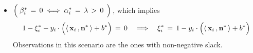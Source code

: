 \begin{itemize}
\item
	$\left(\; \beta_{i}^{*} \,=\, \overset{{\color{white}.}}{0}
	\; \Longleftrightarrow\;
	\alpha_{i}^{*} \,=\, \lambda \,>\, \overset{{\color{white}.}}{0} \,\;\right)$\,,
	which implies
	\begin{equation*}
		1 - \xi_{i}^{*} - y_{i}\cdot\left(\langle\,\mathbf{x}_{i}\,,\mathbf{n}^{*}\,\rangle \overset{{\color{white}.}}{+} b^{*}\right) \, = \, 0
	\quad\Longrightarrow\quad
		\xi_{i}^{*} \, = \, 1 - y_{i}\cdot\left(\langle\,\mathbf{x}_{i}\,,\mathbf{n}^{*}\,\rangle \overset{{\color{white}.}}{+} b^{*}\right)
	\end{equation*}
	Observations in this scenario are the ones with non-negative slack.

\end{itemize}
